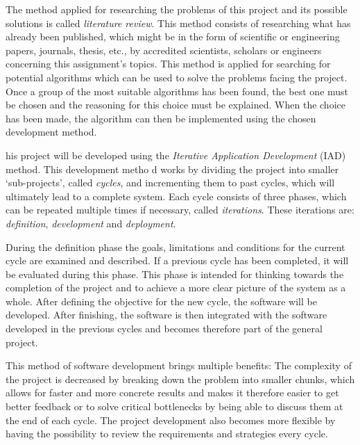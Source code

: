 

The method applied for researching the problems of this project and its possible solutions is called \emph{literature review}. This method consists of researching what has already been published, which might be in the form of scientific or engineering papers, journals, thesis, etc., by accredited scientists, scholars or engineers concerning this assignment's topics. 
This method is applied for searching for potential algorithms which can be used to solve the problems facing the project. Once a group of the most suitable algorithms has been found, the best one must be chosen and the reasoning for this choice must be explained. When the choice has been made, the algorithm can then be implemented using the chosen development method.


his project will be developed using the \emph{Iterative Application Development} (IAD) method. This development metho
d works by dividing the project into smaller `sub-projects', called \emph{cycles}, and incrementing them to past cycles, which will ultimately lead to a complete system. Each cycle consists of three phases, which can be repeated multiple times if necessary, called \emph{iterations}. These iterations are: \emph{definition}, \emph{development} and \emph{deployment}.

During the definition phase the goals, limitations and conditions for the current cycle are examined and described. If a previous cycle has been completed, it will be evaluated during this phase. This phase is intended for thinking towards the completion of the project and to achieve a more clear picture of the system as a whole.
After defining the objective for the new cycle, the software will be developed. After finishing, the software is then integrated with the software developed in the previous cycles and becomes therefore part of the general project.

This method of software development brings multiple benefits: The complexity of the project is decreased by breaking down the problem into smaller chunks, which allows for faster and more concrete results and makes it therefore easier to get better feedback or to solve critical bottlenecks by being able to discuss them at the end of each cycle. The project development also becomes more flexible by having the possibility to review the requirements and strategies every cycle.

